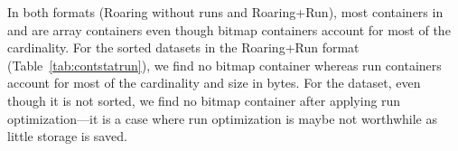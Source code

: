 \documentclass[times]{speauth}
\begin{document}
In both formats (Roaring without runs and Roaring+Run), 
most containers in \CensInc{} and \Weather{} are array containers even though bitmap containers account for most of the cardinality.
For the sorted datasets in the Roaring+Run format (Table~\ref{tab:contstatrun}), we find no bitmap container whereas run containers account for most of the cardinality and size in bytes.
For the \Censeighten{} dataset, even though it is not sorted, we find no bitmap container after applying run optimization---it is a case where run optimization is maybe not worthwhile as little storage is saved.
\begin{table}
\captionsetup[subfloat]{farskip=2pt,captionskip=1pt}
\centering
\caption{\label{tab:contstat}Container statistics for Roaring without runs.}


\end{table}
\end{document}
